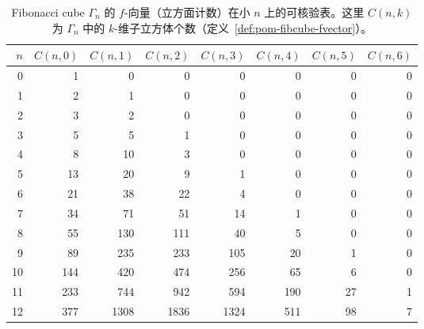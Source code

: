 \begin{table}[H]
\centering
\scriptsize
\setlength{\tabcolsep}{5pt}
\caption{Fibonacci cube $\Gamma_n$ 的 $f$-向量（立方面计数）在小 $n$ 上的可核验表。这里 $C(n,k)$ 为 $\Gamma_n$ 中的 $k$-维子立方体个数（定义~\ref{def:pom-fibcube-fvector}）。}
\label{tab:fibonacci_cube_fvector_small_n}
\begin{tabular}{r r r r r r r r}
\toprule
$n$ & $C(n,0)$ & $C(n,1)$ & $C(n,2)$ & $C(n,3)$ & $C(n,4)$ & $C(n,5)$ & $C(n,6)$\\
\midrule
0 & 1 & 0 & 0 & 0 & 0 & 0 & 0\\
1 & 2 & 1 & 0 & 0 & 0 & 0 & 0\\
2 & 3 & 2 & 0 & 0 & 0 & 0 & 0\\
3 & 5 & 5 & 1 & 0 & 0 & 0 & 0\\
4 & 8 & 10 & 3 & 0 & 0 & 0 & 0\\
5 & 13 & 20 & 9 & 1 & 0 & 0 & 0\\
6 & 21 & 38 & 22 & 4 & 0 & 0 & 0\\
7 & 34 & 71 & 51 & 14 & 1 & 0 & 0\\
8 & 55 & 130 & 111 & 40 & 5 & 0 & 0\\
9 & 89 & 235 & 233 & 105 & 20 & 1 & 0\\
10 & 144 & 420 & 474 & 256 & 65 & 6 & 0\\
11 & 233 & 744 & 942 & 594 & 190 & 27 & 1\\
12 & 377 & 1308 & 1836 & 1324 & 511 & 98 & 7\\
\bottomrule
\end{tabular}
\end{table}

